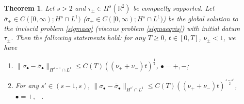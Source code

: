 \documentclass[11pt,reqno]{amsproc}
\newtheorem{thm}{Theorem}
\newcommand{\R}{\mathbb{R}}
\begin{document}
\begin{thm}
    Let $s > 2$ and $\tau_\pm \in H^s(\R^2)$ be compactly supported. Let $\bar\sigma_\pm \in C([0,\infty);H^s \cap L^1)$ ($\sigma_\pm \in C([0,\infty);H^s \cap L^1)$) be the global solution to the inviscid problem \eqref{sigmaeq} (viscous problem \eqref{sigmaeqvis}) with initial datum $\tau_\pm$. Then the following statements hold: for any $T \ge 0$, $t \in [0,T]$, $\nu_\pm < 1$, we have
    \begin{enumerate}
        \item $\|\sigma_\bullet - \bar\sigma_\bullet\|_{H^{s-1}\cap L^1} \le C(T)((\nu_+ + \nu_-) t)^\frac12 $, $\bullet = +,-$;
        \item For any $s' \in (s-1,s)$, $\|\sigma_\bullet - \bar\sigma_\bullet\|_{H^{s'}\cap L^1} \le C(T)((\nu_+ + \nu_-) t)^\frac{s-s'}{2} $, $\bullet = +,-$.
    \end{enumerate}
\end{thm}
\end{document}
